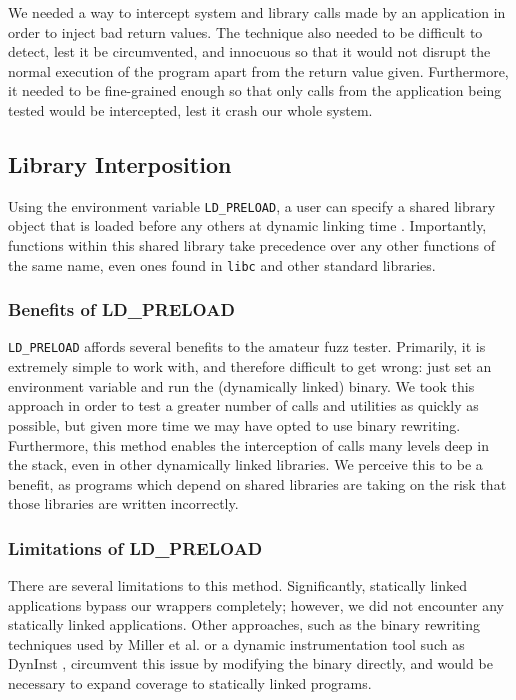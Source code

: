 We needed a way to intercept system and library calls made by an application in order to inject bad return values. The technique also needed to be difficult to detect, lest it be circumvented, and innocuous so that it would not disrupt the normal execution of the program apart from the return value given. Furthermore, it needed to be fine-grained enough so that only calls from the  application being tested would be intercepted, lest it crash our whole system.

\subsection{Library Interposition}
Using the environment variable \texttt{LD\_PRELOAD}, a user can specify a shared library object that is loaded before any others at dynamic linking time \cite{ldpreload}. Importantly, functions within this shared library take precedence over any other functions of the same name, even ones found in \texttt{libc} and other standard libraries.

\subsubsection{Benefits of LD\_PRELOAD}
\texttt{LD\_PRELOAD} affords several benefits to the amateur fuzz tester. Primarily, it is extremely simple to work with, and therefore difficult to get wrong: just set an environment variable and run the (dynamically linked) binary. We took this approach in order to test a greater number of calls and utilities as quickly as possible, but given more time we may have opted to use binary rewriting. Furthermore, this method enables the interception of calls many levels deep in the stack, even in other dynamically linked libraries. We perceive this to be a benefit, as programs which depend on shared libraries are taking on the risk that those libraries are written incorrectly.

\subsubsection{Limitations of LD\_PRELOAD}
There are several limitations to this method. Significantly, statically linked applications bypass our wrappers completely; however, we did not encounter any statically linked applications. Other approaches, such as the binary rewriting techniques used by Miller et al. \cite{bart} or a dynamic instrumentation tool such as DynInst \cite{dyninst}, circumvent this issue by modifying the binary directly, and would be necessary to expand coverage to statically linked programs.

